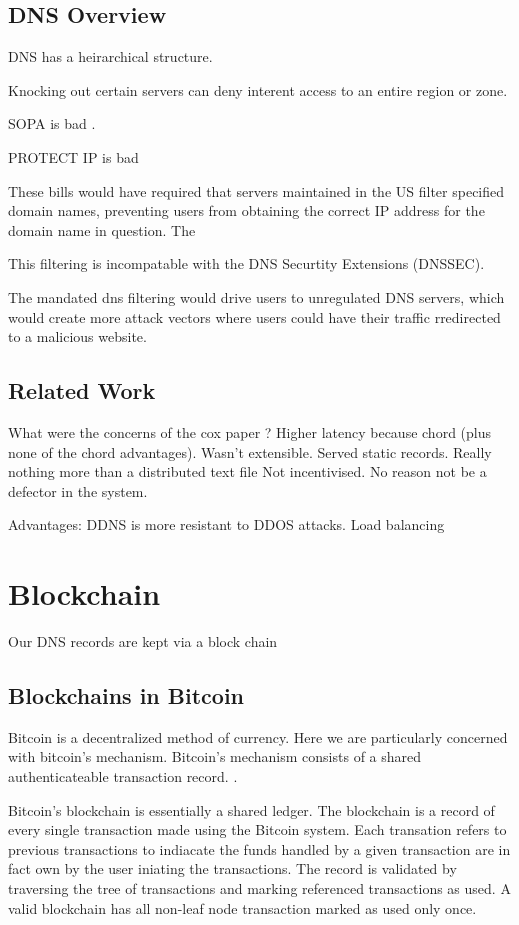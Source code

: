 \documentclass[11pt]{IEEEtran} %
\begin{document}
\subsection{DNS Overview}

DNS has a heirarchical structure.

Knocking out certain servers can deny interent access to an entire region or zone.

SOPA \cite{sopa} is bad \cite{lemley2011don}. 

PROTECT IP is bad \cite{crocker2011security}

These bills would have required that servers maintained in the US filter specified domain names, preventing users from obtaining the correct IP address for the domain name in question. The 

This filtering is incompatable with the DNS Securtity Extensions (DNSSEC)\cite{crocker2011security}. 

The mandated dns filtering would drive users to unregulated DNS servers, which would create more attack vectors where users could have their traffic rredirected to a malicious website. 

\subsection{Related Work}
What were the concerns of the cox paper \cite{cox}?  
Higher latency because chord (plus none of the chord advantages). 
Wasn't extensible.  Served static records.  Really nothing more than a distributed text file
Not incentivised. No reason not be a defector in the system.

Advantages:  DDNS is more resistant to DDOS attacks.  Load balancing 


\section{Blockchain}
Our DNS records are kept via a block chain

\subsection{Blockchains in Bitcoin}
Bitcoin is a decentralized method of currency. Here we are particularly concerned with bitcoin's mechanism. Bitcoin's mechanism consists of a shared authenticateable transaction record.  \cite{bitcoin} \cite{namecoin}.

Bitcoin's blockchain is essentially a shared ledger.  The blockchain is a record of every single transaction made using the Bitcoin system. Each transation refers to previous transactions to indiacate the funds handled by a given transaction are in fact own by the user iniating the transactions. The record is validated by traversing the tree of transactions and marking referenced transactions as used. A valid blockchain has all non-leaf node transaction marked as used only once.
\end{document}
